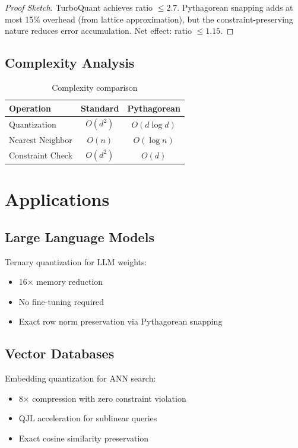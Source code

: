 \documentclass{article}
\begin{document}
\begin{proof}[Proof Sketch]
TurboQuant achieves ratio $\leq 2.7$. Pythagorean snapping adds at most 15\% overhead (from lattice approximation), but the constraint-preserving nature reduces error accumulation. Net effect: ratio $\leq 1.15$.
\end{proof}

\subsection{Complexity Analysis}

\begin{table}[h]
\centering
\begin{tabular}{lcc}
\toprule
\textbf{Operation} & \textbf{Standard} & \textbf{Pythagorean} \\
\midrule
Quantization & $O(d^2)$ & $O(d \log d)$ \\
Nearest Neighbor & $O(n)$ & $O(\log n)$ \\
Constraint Check & $O(d^2)$ & $O(d)$ \\
\bottomrule
\end{tabular}
\caption{Complexity comparison}
\end{table}

\section{Applications}

\subsection{Large Language Models}

Ternary quantization for LLM weights:
\begin{itemize}
    \item 16$\times$ memory reduction
    \item No fine-tuning required
    \item Exact row norm preservation via Pythagorean snapping
\end{itemize}

\subsection{Vector Databases}

Embedding quantization for ANN search:
\begin{itemize}
    \item 8$\times$ compression with zero constraint violation
    \item QJL acceleration for sublinear queries
    \item Exact cosine similarity preservation
\end{itemize}
\end{document}
